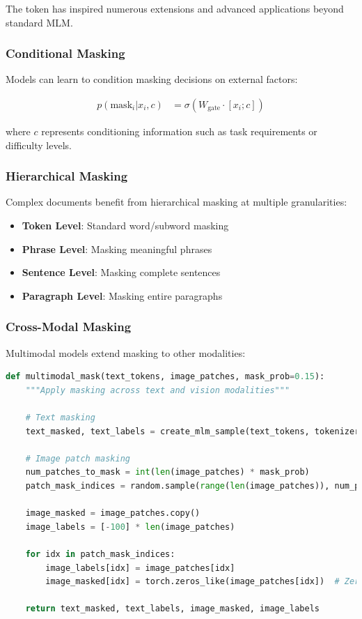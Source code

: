 The \mask{} token has inspired numerous extensions and advanced applications beyond standard MLM.

\subsubsection{Conditional Masking}

Models can learn to condition masking decisions on external factors:

\begin{align}
p(\text{mask}_i | x_i, c) &= \sigma(W_{\text{gate}} \cdot [x_i; c])
\end{align}

where $c$ represents conditioning information such as task requirements or difficulty levels.

\subsubsection{Hierarchical Masking}

Complex documents benefit from hierarchical masking at multiple granularities:

\begin{itemize}
\item \textbf{Token Level}: Standard word/subword masking
\item \textbf{Phrase Level}: Masking meaningful phrases
\item \textbf{Sentence Level}: Masking complete sentences
\item \textbf{Paragraph Level}: Masking entire paragraphs
\end{itemize}

\subsubsection{Cross-Modal Masking}

Multimodal models extend masking to other modalities:

\begin{lstlisting}[language=Python, caption=Cross-modal masking example]
def multimodal_mask(text_tokens, image_patches, mask_prob=0.15):
    """Apply masking across text and vision modalities"""
    
    # Text masking
    text_masked, text_labels = create_mlm_sample(text_tokens, tokenizer, mask_prob)
    
    # Image patch masking
    num_patches_to_mask = int(len(image_patches) * mask_prob)
    patch_mask_indices = random.sample(range(len(image_patches)), num_patches_to_mask)
    
    image_masked = image_patches.copy()
    image_labels = [-100] * len(image_patches)
    
    for idx in patch_mask_indices:
        image_labels[idx] = image_patches[idx]
        image_masked[idx] = torch.zeros_like(image_patches[idx])  # Zero out patch
    
    return text_masked, text_labels, image_masked, image_labels
\end{lstlisting}

